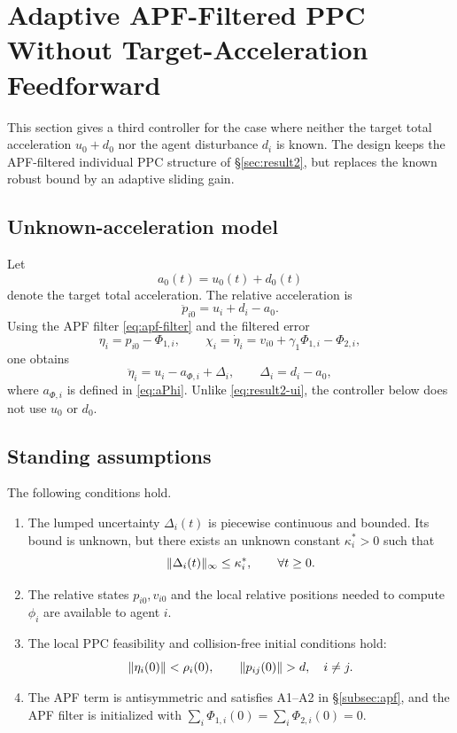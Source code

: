 \section{Adaptive APF-Filtered PPC Without Target-Acceleration Feedforward}
\label{sec:result3}

This section gives a third controller for the case where neither the target
total acceleration $u_0+d_0$ nor the agent disturbance $d_i$ is known.  The
design keeps the APF-filtered individual PPC structure of
\S\ref{sec:result2}, but replaces the known robust bound by an adaptive
sliding gain.

\subsection{Unknown-acceleration model}

Let
\[
a_0(t)=u_0(t)+d_0(t)
\]
denote the target total acceleration.  The relative acceleration is
\[
\ddot p_{i0}=u_i+d_i-a_0.
\]
Using the APF filter \eqref{eq:apf-filter} and the filtered error
\[
\eta_i=p_{i0}-\Phi_{1,i},\qquad
\chi_i=\dot\eta_i=v_{i0}+\gamma_1\Phi_{1,i}-\Phi_{2,i},
\]
one obtains
\begin{equation}
\ddot\eta_i=u_i-a_{\Phi,i}+\Delta_i,
\qquad
\Delta_i=d_i-a_0,
\label{eq:r3-eta-dyn}
\end{equation}
where $a_{\Phi,i}$ is defined in \eqref{eq:aPhi}.  Unlike
\eqref{eq:result2-ui}, the controller below does not use $u_0$ or $d_0$.

\subsection{Standing assumptions}

\begin{assumption}
\label{as:result3}
The following conditions hold.
\begin{enumerate}
    \item The lumped uncertainty $\Delta_i(t)$ is piecewise continuous and
    bounded.  Its bound is unknown, but there exists an unknown constant
    $\kappa_i^*>0$ such that
    \[
    \lVert \Delta_i(t) \rVert_\infty\le \kappa_i^*,
    \qquad \forall t\ge0.
    \]

    \item The relative states $p_{i0},v_{i0}$ and the local relative
    positions needed to compute $\phi_i$ are available to agent $i$.

    \item The local PPC feasibility and collision-free initial conditions
    hold:
    \[
    \lVert \eta_i(0) \rVert<\rho_i(0),\qquad
    \lVert p_{ij}(0) \rVert>d,\quad i\neq j.
    \]

    \item The APF term is antisymmetric and satisfies A1--A2 in
    \S\ref{subsec:apf}, and the APF filter is initialized with
    $\sum_i\Phi_{1,i}(0)=\sum_i\Phi_{2,i}(0)=0$.
\end{enumerate}
\end{assumption}

